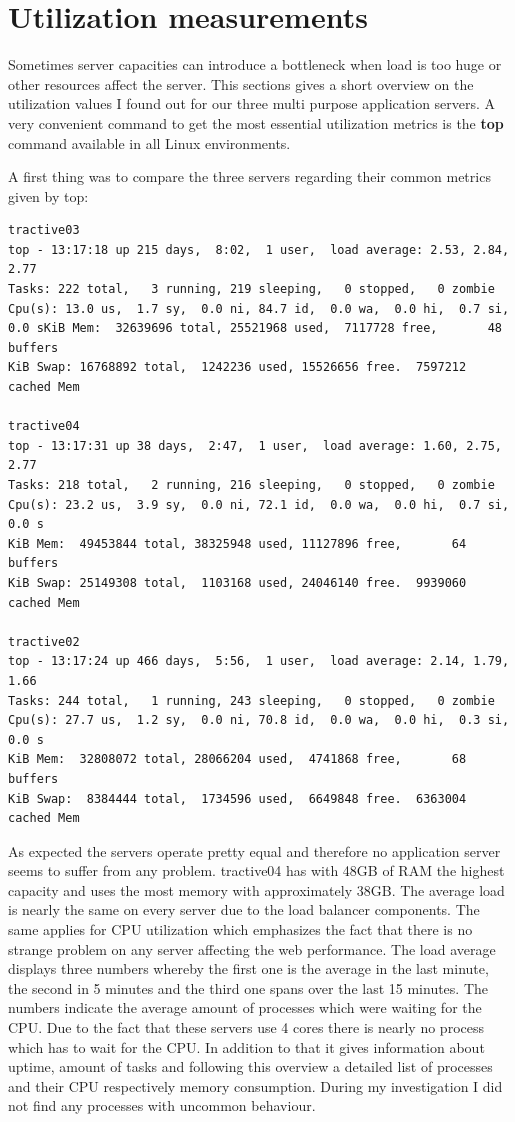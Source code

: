 \section{Utilization measurements}
Sometimes server capacities can introduce a bottleneck when load is too huge or other resources affect the server. This sections gives a short overview on the utilization values I found out for our three multi purpose application servers.  A very convenient command to get the most essential utilization metrics is the \textbf{top} command available in all Linux environments.

A first thing was to compare the three servers regarding their common metrics given by top:
\begin{lstlisting}
tractive03
top - 13:17:18 up 215 days,  8:02,  1 user,  load average: 2.53, 2.84, 2.77
Tasks: 222 total,   3 running, 219 sleeping,   0 stopped,   0 zombie
Cpu(s): 13.0 us,  1.7 sy,  0.0 ni, 84.7 id,  0.0 wa,  0.0 hi,  0.7 si,  0.0 sKiB Mem:  32639696 total, 25521968 used,  7117728 free,       48 buffers
KiB Swap: 16768892 total,  1242236 used, 15526656 free.  7597212 cached Mem

tractive04
top - 13:17:31 up 38 days,  2:47,  1 user,  load average: 1.60, 2.75, 2.77
Tasks: 218 total,   2 running, 216 sleeping,   0 stopped,   0 zombie
Cpu(s): 23.2 us,  3.9 sy,  0.0 ni, 72.1 id,  0.0 wa,  0.0 hi,  0.7 si,  0.0 s
KiB Mem:  49453844 total, 38325948 used, 11127896 free,       64 buffers
KiB Swap: 25149308 total,  1103168 used, 24046140 free.  9939060 cached Mem

tractive02
top - 13:17:24 up 466 days,  5:56,  1 user,  load average: 2.14, 1.79, 1.66
Tasks: 244 total,   1 running, 243 sleeping,   0 stopped,   0 zombie
Cpu(s): 27.7 us,  1.2 sy,  0.0 ni, 70.8 id,  0.0 wa,  0.0 hi,  0.3 si,  0.0 s
KiB Mem:  32808072 total, 28066204 used,  4741868 free,       68 buffers
KiB Swap:  8384444 total,  1734596 used,  6649848 free.  6363004 cached Mem
\end{lstlisting}
As expected the servers operate pretty equal and therefore no application server seems to suffer from any problem. tractive04 has with 48GB of RAM the highest capacity and uses the most memory with approximately 38GB. The average load is nearly the same on every server due to the load balancer components. The same applies for CPU utilization which emphasizes the fact that there is no strange problem on any server affecting the web performance. The load average displays three numbers whereby the first one is the average in the last minute, the second in 5 minutes and the third one spans over the last 15 minutes. The numbers indicate the average amount of processes which were waiting for the CPU. Due to the fact that these servers use 4 cores there is nearly no process which has to wait for the CPU. In addition to that it gives information about uptime, amount of tasks and following this overview a detailed list of processes and their CPU respectively memory consumption. During my investigation I did not find any processes with uncommon behaviour.  

